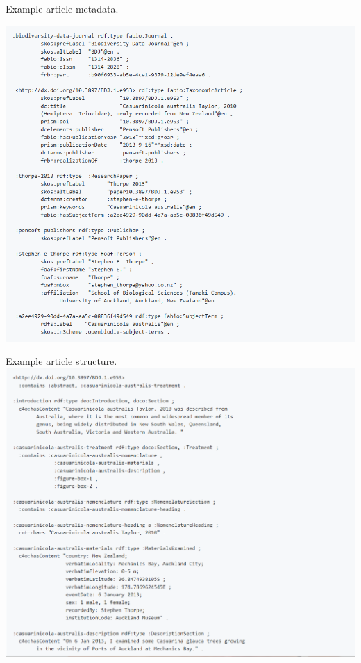\documentclass[bulgarian]{beamer}
\begin{document}
\begin{frame}{Example article metadata.}
	\centering

	\includegraphics[width=\textwidth]{Figures/example-article-metadata}
	\decoRule
  
\end{frame}

\begin{frame}{Example article structure.}
  \centering
  \includegraphics[width=\textwidth]{Figures/example-article-structure}
  \decoRule
\end{frame}
\end{document}

